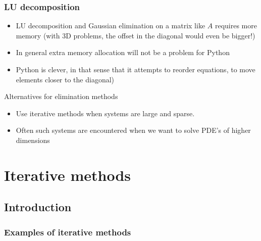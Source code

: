 \begin{frame}[fragile]
  \frametitle{LU decomposition}
  \begin{itemize}
    \item LU decomposition and Gaussian elimination on a matrix like $A$ requires more memory (with 3D problems, the offset in the diagonal would even be bigger!)
    \item In general extra memory allocation will not be a problem for Python
    \item Python is clever, in that sense that it attempts to reorder equations, to move elements closer to the diagonal)
  \end{itemize} \pause
  Alternatives for elimination methods
  \begin{itemize}
    \item Use iterative methods when systems are large and sparse.
    \item Often such systems are encountered when we want to solve PDE’s of higher dimensions
  \end{itemize}
\end{frame}

\section{Iterative methods}
\subsection*{Introduction}

\begin{frame}[fragile]
  \frametitle{Examples of iterative methods}
\end{frame}

